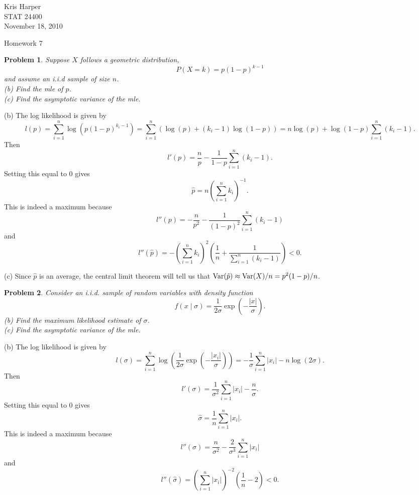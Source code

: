 \documentclass{article}
\newtheorem{problem}{Problem}
\newcommand{\var}{\textup{Var}}
\begin{document}
\begin{flushright}
Kris Harper\\

STAT 24400\\

November 18, 2010
\end{flushright}

\begin{center}
Homework 7
\end{center}

\begin{problem}
Suppose $X$ follows a geometric distribution,
\[
P(X = k) = p(1-p)^{k-1}
\]
and assume an i.i.d sample of size $n$.\\
(b) Find the mle of $p$.\\
(c) Find the asymptotic variance of the mle.
\end{problem}

(b) The log likelihood is given by
\[
l(p) = \sum_{i=1}^n \log \left (p(1-p)^{k_i-1} \right ) = \sum_{i=1}^n \left ( \log(p) + (k_i-1)\log(1-p) \right ) = n\log(p) + \log(1-p) \sum_{i=1}^n (k_i-1).
\]
Then
\[
l'(p) = \frac{n}{p} - \frac{1}{1-p} \sum_{i=1}^n (k_i - 1).
\]
Setting this equal to $0$ gives
\[
\hat{p} = n \left (\sum_{i=1}^n k_i \right )^{-1}.
\]
This is indeed a maximum because
\[
l''(p) = -\frac{n}{p^2} - \frac{1}{(1-p)^2} \sum_{i=1}^n (k_i - 1)
\]
and
\[
l''(\hat{p}) = -\left ( \sum_{i=1}^n k_i \right )^2 \left ( \frac{1}{n} + \frac{1}{\sum_{i=1}^n (k_i - 1)} \right ) < 0.
\]

(c) Since $\hat{p}$ is an average, the central limit theorem will tell us that $\var(\hat{p}) \approx \var(X)/n = p^2(1-p)/n$.

\begin{problem}
Consider an i.i.d. sample of random variables with density function
\[
f(x \mid \sigma) = \frac{1}{2 \sigma} \exp \left ( -\frac{|x|}{\sigma} \right ).
\]
(b) Find the maximum likelihood estimate of $\sigma$.\\
(c) Find the asymptotic variance of the mle.
\end{problem}

(b) The log likelihood is given by
\[
l(\sigma) = \sum_{i=1}^n \log \left (\frac{1}{2 \sigma} \exp \left ( -\frac{|x_i|}{\sigma} \right ) \right ) = -\frac{1}{\sigma} \sum_{i=1}^n |x_i| - n\log(2 \sigma).
\]
Then
\[
l'(\sigma) = \frac{1}{\sigma^2} \sum_{i=1}^n |x_i| - \frac{n}{\sigma}.
\]
Setting this equal to $0$ gives
\[
\hat{\sigma} = \frac{1}{n} \sum_{i=1}^n |x_i|.
\]
This is indeed a maximum because
\[
l''(\sigma) = \frac{n}{\sigma^2} - \frac{2}{\sigma^3} \sum_{i=1}^n |x_i|
\]
and
\[
l''(\hat{\sigma}) = \left ( \sum_{i=1}^n |x_i| \right )^{-2} \left (\frac{1}{n} - 2 \right ) < 0.
\]
\end{document}
